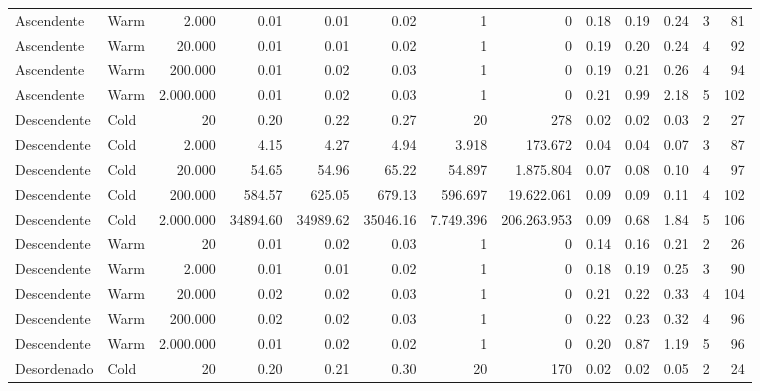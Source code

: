 \documentclass[12pt,a4paper]{article}
\begin{document}
\begin{table}[H]
{\begin{tabular}{llr rrr rr rrr rr}
Ascendente  & Warm & 2.000               &    0.01 &    0.01 &    0.02 &     1 &     0 &    0.18 &    0.19 &    0.24 &     3 &    81 \\
Ascendente  & Warm & 20.000            &    0.01 &    0.01 &    0.02 &     1 &     0 &    0.19 &    0.20 &    0.24 &     4 &    92 \\
Ascendente  & Warm & 200.000         &    0.01 &    0.02 &    0.03 &     1 &     0 &    0.19 &    0.21 &    0.26 &     4 &    94 \\
Ascendente  & Warm & 2.000.000   &    0.01 &    0.02 &    0.03 &     1 &     0 &    0.21 &    0.99 &    2.18 &     5 &   102 \\
\midrule
Descendente & Cold & 20                        &    0.20 &    0.22 &    0.27 &    20 &   278 &    0.02 &    0.02 &    0.03 &     2 &    27 \\
Descendente & Cold & 2.000               &    4.15 &    4.27 &    4.94 & 3.918 & 173.672 &    0.04 &    0.04 &    0.07 &     3 &    87 \\
Descendente & Cold & 20.000            &   54.65 &   54.96 &   65.22 & 54.897 & 1.875.804 &    0.07 &    0.08 &    0.10 &     4 &    97 \\
Descendente & Cold & 200.000         &  584.57 &  625.05 &  679.13 & 596.697 & 19.622.061 &    0.09 &    0.09 &    0.11 &     4 &   102 \\
Descendente & Cold & 2.000.000   & 34894.60 & 34989.62 & 35046.16 & 7.749.396 & 206.263.953 &    0.09 &    0.68 &    1.84 &     5 &   106 \\
\midrule
Descendente & Warm & 20                        &    0.01 &    0.02 &    0.03 &     1 &     0 &    0.14 &    0.16 &    0.21 &     2 &    26 \\
Descendente & Warm & 2.000               &    0.01 &    0.01 &    0.02 &     1 &     0 &    0.18 &    0.19 &    0.25 &     3 &    90 \\
Descendente & Warm & 20.000            &    0.02 &    0.02 &    0.03 &     1 &     0 &    0.21 &    0.22 &    0.33 &     4 &   104 \\
Descendente & Warm & 200.000         &    0.02 &    0.02 &    0.03 &     1 &     0 &    0.22 &    0.23 &    0.32 &     4 &    96 \\
Descendente & Warm & 2.000.000   &    0.01 &    0.02 &    0.02 &     1 &     0 &    0.20 &    0.87 &    1.19 &     5 &    96 \\
\midrule
Desordenado & Cold & 20                        &    0.20 &    0.21 &    0.30 &    20 &   170 &    0.02 &    0.02 &    0.05 &     2 &    24 \\

\end{tabular}}
\end{table}
\end{document}
